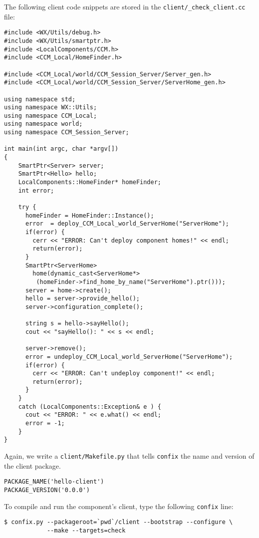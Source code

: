 \noindent
The following client code snippets are stored in the 
{\tt client/\_check\_client.cc} file:
\begin{small}
\begin{verbatim}
#include <WX/Utils/debug.h>
#include <WX/Utils/smartptr.h>
#include <LocalComponents/CCM.h>
#include <CCM_Local/HomeFinder.h>

#include <CCM_Local/world/CCM_Session_Server/Server_gen.h>
#include <CCM_Local/world/CCM_Session_Server/ServerHome_gen.h>

using namespace std;
using namespace WX::Utils;
using namespace CCM_Local;
using namespace world;
using namespace CCM_Session_Server;

int main(int argc, char *argv[])
{
    SmartPtr<Server> server;
    SmartPtr<Hello> hello;
    LocalComponents::HomeFinder* homeFinder;
    int error;

    try {
      homeFinder = HomeFinder::Instance();
      error  = deploy_CCM_Local_world_ServerHome("ServerHome");
      if(error) {
        cerr << "ERROR: Can't deploy component homes!" << endl;
        return(error);
      }
      SmartPtr<ServerHome> 
        home(dynamic_cast<ServerHome*>
         (homeFinder->find_home_by_name("ServerHome").ptr()));
      server = home->create();   
      hello = server->provide_hello();
      server->configuration_complete();

      string s = hello->sayHello();
      cout << "sayHello(): " << s << endl;

      server->remove();
      error = undeploy_CCM_Local_world_ServerHome("ServerHome");
      if(error) {
        cerr << "ERROR: Can't undeploy component!" << endl;
        return(error);
      }
    } 
    catch (LocalComponents::Exception& e ) {
      cout << "ERROR: " << e.what() << endl;
      error = -1;
    } 
}
\end{verbatim}
\end{small}


\noindent
Again, we write a {\tt client/Makefile.py} that tells {\tt confix} the
name and version of the client package.
\begin{small}
\begin{verbatim}
PACKAGE_NAME('hello-client')
PACKAGE_VERSION('0.0.0')
\end{verbatim}
\end{small}

\noindent
To compile and run the component's client, type the following {\tt confix}
line: 
\begin{small}
\begin{verbatim}
$ confix.py --packageroot=`pwd`/client --bootstrap --configure \
            --make --targets=check
\end{verbatim}
\end{small}


